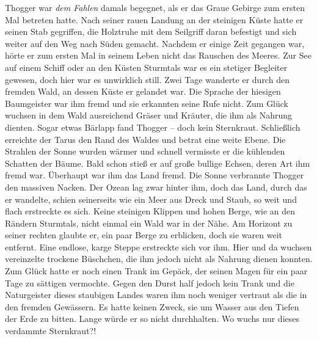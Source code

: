 \documentclass[10pt, a4paper, oneside]{book}
\begin{document}
\begin{multicols}{2}
Thogger war \textit{dem Fahlen} damals begegnet, als er das Graue Gebirge zum ersten Mal betreten hatte. Nach seiner rauen Landung an der steinigen Küste hatte er seinen Stab gegriffen, die Holztruhe mit dem Seilgriff daran befestigt und sich weiter auf den Weg nach Süden gemacht. Nachdem er einige Zeit gegangen war, hörte er zum ersten Mal in seinem Leben nicht das Rauschen des Meeres. Zur See auf einem Schiff oder an den Küsten Sturmtals war es ein stetiger Begleiter gewesen, doch hier war es unwirklich still. Zwei Tage wanderte er durch den fremden Wald, an dessen Küste er gelandet war. Die Sprache der hiesigen Baumgeister war ihm fremd und sie erkannten seine Rufe nicht. Zum Glück wuchsen in dem Wald ausreichend Gräser und Kräuter, die ihm als Nahrung dienten. Sogar etwas Bärlapp fand Thogger – doch kein Sternkraut. Schließlich erreichte der Tarus den Rand des Waldes und betrat eine weite Ebene. Die Strahlen der Sonne wurden wärmer und schnell vermisste er die kühlenden Schatten der Bäume. Bald schon stieß er auf große bullige Echsen, deren Art ihm fremd war. Überhaupt war ihm das Land fremd. Die Sonne verbrannte Thogger den massiven Nacken. Der Ozean lag zwar hinter ihm, doch das Land, durch das er wandelte, schien seinerseits wie ein Meer aus Dreck und Staub, so weit und flach erstreckte es sich. Keine steinigen Klippen und hohen Berge, wie an den Rändern Sturmtals, nicht einmal ein Wald war in der Nähe. Am Horizont zu seiner rechten glaubte er, ein paar Berge zu erblicken, doch sie waren weit entfernt. Eine endlose, karge Steppe erstreckte sich vor ihm. Hier und da wuchsen vereinzelte trockene Büschchen, die ihm jedoch nicht als Nahrung dienen konnten. Zum Glück hatte er noch einen Trank im Gepäck, der seinen Magen für ein paar Tage zu sättigen vermochte. Gegen den Durst half jedoch kein Trank und die Naturgeister dieses staubigen Landes waren ihm noch weniger vertraut als die in den fremden Gewässern. Es hatte keinen Zweck, sie um Wasser aus den Tiefen der Erde zu bitten. Lange würde er so nicht durchhalten. Wo wuchs nur dieses verdammte Sternkraut?!\bigskip


\end{multicols}
\end{document}
